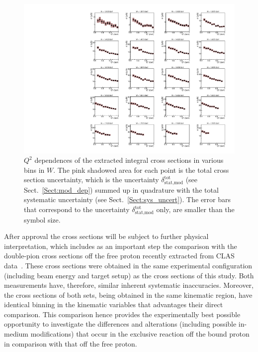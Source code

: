 \begin{figure}[htp]
\begin{center}
\includegraphics[width=\textwidth]{pictures/conclusion/q2dep_20Jul2021.pdf}
\caption{\small $Q^{2}$ dependences of the extracted integral cross sections in various bins in $W$. The pink shadowed area for each point is the total cross section uncertainty, which is the uncertainty $\delta_{\text{stat,mod}}^{\text{tot}}$ (see Sect.~\ref{Sect:mod_dep}) summed up in quadrature with the total systematic uncertainty (see Sect.~\ref{Sect:sys_uncert}). The error bars that correspond to the uncertainty $\delta_{\text{stat,mod}}^{\text{tot}}$ only, are smaller than the symbol size.  } \label{fig:int_q2_dep}
\end{center}
\end{figure}


After approval the cross sections will be subject to further physical interpretation, which includes as an important step the comparison with the double-pion cross sections off the free proton recently extracted from CLAS data~\cite{Fed_an_note:2017,Fed_paper_2018}. These cross sections were obtained in the same experimental configuration (including beam energy and target setup) as the cross sections of this study. Both measurements have, therefore, similar inherent systematic inaccuracies. Moreover, the cross sections of both sets, being obtained in the same kinematic region, have identical binning in the kinematic variables that advantages their direct comparison. This comparison hence provides the experimentally best possible opportunity to investigate the differences and alterations (including possible in-medium modifications) that occur in the exclusive reaction off the bound proton in comparison with that off the free proton.

